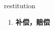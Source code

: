 
\begin{frame}
{\huge restitution}
\begin{center}
\begin{enumerate}\Large
  \item \textbf{补偿，赔偿}
\end{enumerate}
\end{center}
\end{frame}
